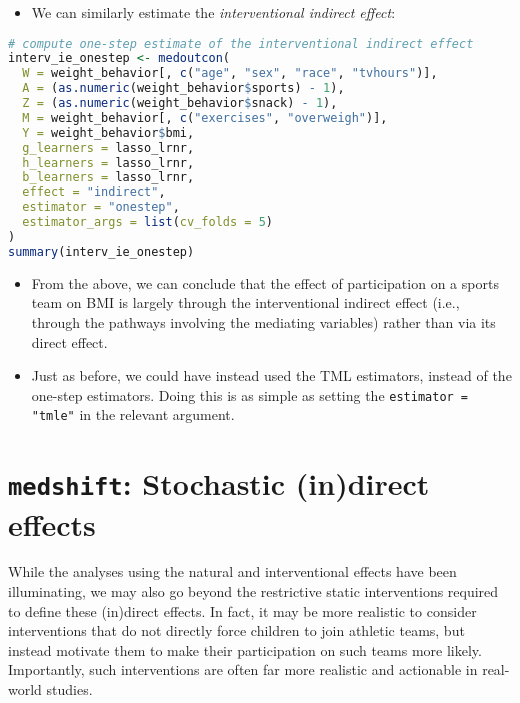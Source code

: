 \documentclass[
  12pt,
]{book}
\newcommand{\passthrough}[1]{#1}
\providecommand{\tightlist}{%
  \setlength{\itemsep}{0pt}\setlength{\parskip}{0pt}}
\theoremstyle{definition}
\theoremstyle{definition}
\theoremstyle{definition}
\newcommand{\1}{\mathbbm{1}}
\begin{document}
\begin{itemize}
\tightlist
\item
  We can similarly estimate the \emph{interventional indirect effect}:
\end{itemize}

\begin{lstlisting}[language=R]
# compute one-step estimate of the interventional indirect effect
interv_ie_onestep <- medoutcon(
  W = weight_behavior[, c("age", "sex", "race", "tvhours")],
  A = (as.numeric(weight_behavior$sports) - 1),
  Z = (as.numeric(weight_behavior$snack) - 1),
  M = weight_behavior[, c("exercises", "overweigh")],
  Y = weight_behavior$bmi,
  g_learners = lasso_lrnr,
  h_learners = lasso_lrnr,
  b_learners = lasso_lrnr,
  effect = "indirect",
  estimator = "onestep",
  estimator_args = list(cv_folds = 5)
)
summary(interv_ie_onestep)
\end{lstlisting}

\begin{itemize}
\tightlist
\item
  From the above, we can conclude that the effect of participation on a sports
  team on BMI is largely through the interventional indirect effect (i.e.,
  through the pathways involving the mediating variables) rather than via its
  direct effect.
\item
  Just as before, we could have instead used the TML estimators, instead of the
  one-step estimators. Doing this is as simple as setting the
  \passthrough{\lstinline!estimator = "tmle"!} in the relevant argument.
\end{itemize}

\hypertarget{medshift-stochastic-indirect-effects}{%
\section{\texorpdfstring{\texttt{medshift}: Stochastic (in)direct effects}{medshift: Stochastic (in)direct effects}}\label{medshift-stochastic-indirect-effects}}

While the analyses using the natural and interventional effects have been
illuminating, we may also go beyond the restrictive static interventions
required to define these (in)direct effects. In fact, it may be more realistic
to consider interventions that do not directly force children to join athletic
teams, but instead motivate them to make their participation on such teams more
likely. Importantly, such interventions are often far more realistic and
actionable in real-world studies.
\end{document}
